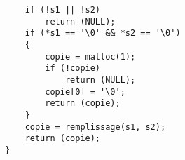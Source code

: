 \documentclass{article}
\begin{document}
\begin{itemize}[label=$\rightarrow$]
\begin{verbatim}
    if (!s1 || !s2)                                                             
        return (NULL);                                                          
    if (*s1 == '\0' && *s2 == '\0')                                             
    {                                                                           
        copie = malloc(1);                                                      
        if (!copie)                                                             
            return (NULL);                                                      
        copie[0] = '\0';                                                        
        return (copie);                                                         
    }                                                                           
    copie = remplissage(s1, s2);                                                
    return (copie);                                                             
} 
			\end{verbatim}
		\end{itemize}
	
\end{document}
